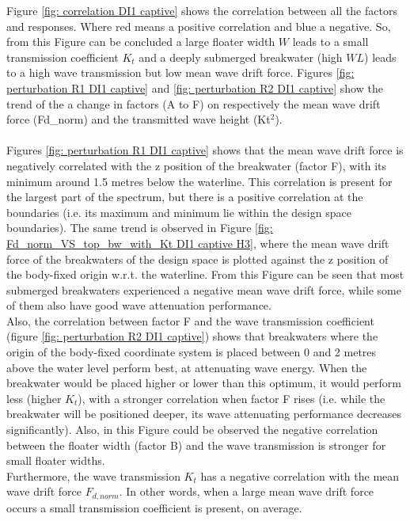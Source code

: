 Figure \ref{fig: correlation DI1 captive} shows the correlation between all the factors and responses. Where red means a positive correlation and blue a negative. So, from this Figure can be concluded a large floater width $W$ leads to a small transmission coefficient $K_t$ and a deeply submerged breakwater (high $WL$) leads to a high wave transmission but low mean wave drift force. Figures \ref{fig: perturbation R1 DI1 captive} and \ref{fig: perturbation R2 DI1 captive} show the trend of the a change in factors (A to F) on respectively the mean wave drift force (Fd\_norm) and the transmitted wave height (Kt$^2$).\\
\\
Figures \ref{fig: perturbation R1 DI1 captive} shows that the mean wave drift force is negatively correlated with the z position of the breakwater (factor F), with its minimum around 1.5 metres below the waterline. This correlation is present for the largest part of the spectrum, but there is a positive correlation at the boundaries (i.e. its maximum and minimum lie within the design space boundaries). The same trend is observed in Figure \ref{fig: Fd_norm_VS_top_bw_with_Kt DI1 captive H3}, where the mean wave drift force of the breakwaters of the design space is plotted against the z position of the body-fixed origin w.r.t. the waterline. From this Figure can be seen that most submerged breakwaters experienced a negative mean wave drift force, while some of them also have good wave attenuation performance. \\
Also, the correlation between factor F and the wave transmission  coefficient (figure \ref{fig: perturbation R2 DI1 captive}) shows that breakwaters where the origin of the body-fixed coordinate system is placed between 0 and 2 metres above the water level perform best, at attenuating wave energy. When the breakwater would be placed higher or lower than this optimum, it would perform less (higher $K_t$), with a stronger correlation when factor F rises (i.e. while the breakwater will be positioned deeper, its wave attenuating performance decreases significantly). Also, in this Figure could be observed the negative correlation between the floater width (factor B) and the wave transmission is stronger for small floater widths.\\
Furthermore, the wave transmission $K_t$ has a negative correlation with the mean wave drift force $F_{d,norm}$. In other words, when a large mean wave drift force occurs a small transmission coefficient is present, on average. 



